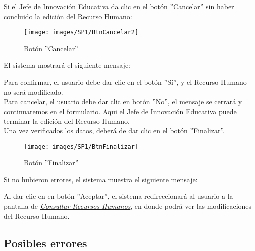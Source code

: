             Si el Jefe de Innovación Educativa da clic en el botón ''Cancelar'' sin haber concluido la edición del Recurso Humano:

            \begin{figure}[!hbtp]
            	\centering
            	\hypertarget{cancel2}{\texttt{[image: images/SP1/BtnCancelar2]}}
            	\caption{Botón ''Cancelar''}
            	\label{cancel2}
            \end{figure}

            El sistema mostrará el siguiente mensaje:

            Para confirmar, el usuario debe dar clic en el botón ''Sí'', y el Recurso Humano no será modificado.\\

            Para cancelar, el usuario debe dar clic en botón ''No'', el mensaje se cerrará y continuaremos en el formulario. Aqui el Jefe de Innovación Educativa puede terminar la edición del Recurso Humano.\\

            Una vez verificados los datos, deberá de dar clic en el botón ''Finalizar''.
            \begin{figure}[!hbtp]
            	\centering
            	\hypertarget{btnfin}{\texttt{[image: images/SP1/BtnFinalizar]}}
            	\caption{Botón ''Finalizar''}
            	\label{btnfin}
            \end{figure}

            Si no hubieron errores, el sistema muestra el siguiente mensaje:

            Al dar clic en en botón ''Aceptar'', el sistema redireccionará al usuario a la pantalla de \hyperlink{consultarrh}{\textit{Consultar Recursos Humanos}}, en donde podrá ver las modificaciones del Recurso Humano.\\

            \subsection{Posibles errores}

